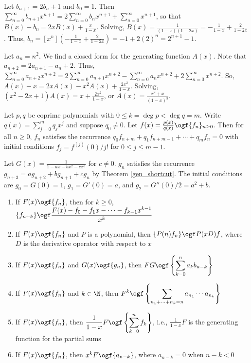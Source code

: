 \documentclass[a4paper]{article}
\begin{document}
\begin{example}
Let $b_{n+1}=2b_n+1$ and $b_0=1$. Then $\sum_{n=0}^\infty b_{n+1}x^{n+1}=2\sum_{n=0}^\infty b_nx^{n+1}+\sum_{n=0}^\infty x^{n+1}$, so that $B(x)-b_0=2xB(x)+\frac x{1-x}$. Solving, $B(x)=\frac1{(1-x)(1-2x)}=-\frac1{1-x}+\frac2{1-2x}$. Thus, $b_n=[x^n]\left(-\frac1{1-x}+\frac2{1-2x}\right)=-1+2(2)^n=2^{n+1}-1$.
\end{example}

\begin{example}\label{nsqgen}
Let $a_n=n^2$. We find a closed form for the generating function $A(x)$. Note that $a_{n+2}=2a_{n+1}-a_{n}+2$. Thus, $\sum_{n=0}^\infty a_{n+2}x^{n+2}=2\sum_{n=0}^\infty a_{n+1}x^{n+2}-\sum_{n=0}^\infty a_nx^{n+2}+2\sum_{n=0}^\infty x^{n+2}$. So, $A(x)-x=2xA(x)-x^2A(x)+\frac{2x^2}{1-x}$. Solving, $(x^2-2x+1)A(x)=x+\frac{2x^2}{1-x}$, or $A(x)=\frac{x^2+x}{(1-x)^3}$.
\end{example}

\begin{theorem}\label{gen_shortcut}
Let $p,q$ be coprime polynomials with $0\leq k=\deg p<\deg q=m$. Write $q(x)=\sum_{j=0}^mq_jx^j$ and suppose $q_0\neq0$. Let $f(x)=\frac{p(x)}{q(x)}\ogf \{f_n\}_{n\geq0}$. Then for all $n\geq0$, $f_n$ satisfies the recurrence $q_0f_{n+m}+q_1f_{n+m-1}+\cdots+q_mf_n=0$ with initial conditions $f_j=f^{(j)}(0)/j!$ for $0\leq j\leq m-1$.
\end{theorem}

\begin{example}
Let $G(x)=\frac1{1-ax-bx^2-cx^3}$ for $c\neq0$. $g_n$ satisfies the recurrence $g_{n+3}=ag_{n+2}+bg_{n+1}+cg_n$ by Theorem \ref{gen_shortcut}. The initial conditions are $g_0=G(0)=1$, $g_1=G'(0)=a$, and $g_2=G''(0)/2=a^2+b$.
\end{example}

\begin{theorem}\label{wilf}
\;
\begin{enumerate}[label=\Roman*.]
\item\label{wilf1} If $F(x)\ogf \{f_n\}$, then for $k\geq0$, $\displaystyle\{f_{n+k}\}\ogf \frac{F(x)-f_0-f_1x-\cdots-f_{k-1}x^{k-1}}{x^k}$
\item\label{wilf2} If $F(x)\ogf \{f_n\}$ and $P$ is a polynomial, then $\{P(n)f_n\}\ogf  P(xD)f$, where $D$ is the derivative operator with respect to $x$
\item\label{wilf3} If $F(x)\ogf \{f_n\}$ and $G(x)\ogf \{g_n\}$, then $\displaystyle FG\ogf \left\{\sum_{k=0}^na_kb_{n-k}\right\}$
\item\label{wilf4} If $F(x)\ogf\{f_n\}$ and $k\in\N$, then $\displaystyle F^k\ogf\left\{\sum_{n_1+\cdots+n_k=n}a_{n_1}\cdots a_{n_k}\right\}$
\item\label{wilf5} If $F(x)\ogf\{f_n\}$, then $\displaystyle\frac1{1-x}F\ogf\left\{\sum_{k=0}^nf_k\right\}$, i.e., $\displaystyle\frac1{1-x}F$ is the generating function for the partial sums
\item\label{wilf6} If $F(x)\ogf\{f_n\}$, then $x^kF\ogf\{a_{n-k}\}$, where $a_{n-k}=0$ when $n-k<0$
\end{enumerate}
\end{theorem}
\end{document}
